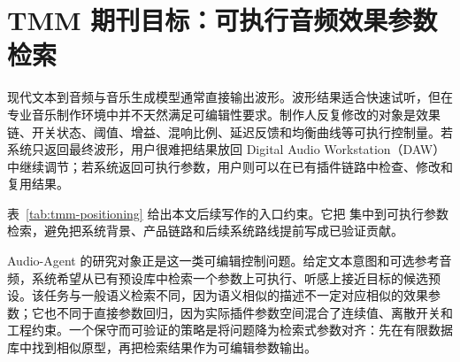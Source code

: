 \chapter{TMM 期刊目标：可执行音频效果参数检索}

现代文本到音频与音乐生成模型通常直接输出波形。波形结果适合快速试听，但在专业音乐制作环境中并不天然满足可编辑性要求。制作人反复修改的对象是效果链、开关状态、阈值、增益、混响比例、延迟反馈和均衡曲线等可执行控制量。若系统只返回最终波形，用户很难把结果放回 Digital Audio Workstation（DAW）中继续调节；若系统返回可执行参数，用户则可以在已有插件链路中检查、修改和复用结果。



\begin{table}[H]
	\centering
	\caption{TMM 期刊定位边界。}
	\label{tab:tmm-positioning}
	\small
\end{table}

表~\ref{tab:tmm-positioning} 给出本文后续写作的入口约束。它把  集中到可执行参数检索，避免把系统背景、产品链路和后续系统路线提前写成已验证贡献。

Audio-Agent 的研究对象正是这一类可编辑控制问题。给定文本意图和可选参考音频，系统希望从已有预设库中检索一个参数上可执行、听感上接近目标的候选预设。该任务与一般语义检索不同，因为语义相似的描述不一定对应相似的效果参数；它也不同于直接参数回归，因为实际插件参数空间混合了连续值、离散开关和工程约束。一个保守而可验证的策略是将问题降为检索式参数对齐：先在有限数据库中找到相似原型，再把检索结果作为可编辑参数输出。

